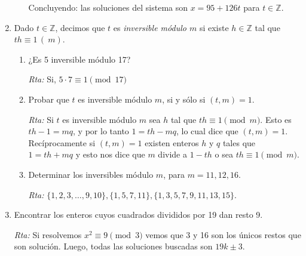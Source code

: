 \documentclass[a4paper,12pt,twoside,spanish,reqno]{amsbook}
\numberwithin{equation}{section}
\newcommand{\rta}{\noindent\textit{Rta: }}
\newcommand \Z{{\mathbb Z}}
\begin{document}
\begin{enumerate}
\begin{enumerate}
        \noindent Concluyendo: las soluciones del sistema son $x = 95 + 126t$ para  $t \in \mathbb{Z}$. 

    \end{enumerate}
    
    
    
    \item Dado $t \in {\Z}$, decimos que $t$ es {\it inversible módulo $m$} si existe $h \in {\Z}$ tal que $th\equiv 1\,(\ m)$.
    \begin{enumerate}
        \item ¿Es 5 inversible módulo 17?
            
        \rta Si, $5\cdot 7\equiv 1 \pmod{17}$
        
        \item Probar que $t$ es inversible módulo $m$, si y sólo si $(t,m)=1$.
            
        \rta Si $t$ es inversible módulo $m$ sea $h$ tal que $th\equiv 1 \pmod{m}$. Esto es $th-1=mq$, y por lo tanto $1=th-mq$, lo cual dice que $(t,m)=1$. Recíprocamente si $(t, m)=1$ existen enteros $h$ y $q$ tales que $1=th+mq$ y esto nos dice que $m$ divide a $1-th$ o sea $th\equiv 1 \pmod{m}$.
        
        \item Determinar los inversibles módulo $m$, para $m=11,12,16$.
            
        \rta $\{1,2,3,\dots, 9,10\}, \{1, 5, 7,11\} , \{1, 3, 5, 7, 9 ,11, 13, 15\}$.
        
    \end{enumerate}
    
    
    
    
    
    \item Encontrar los enteros cuyos cuadrados divididos por 19 dan resto 9.
        
    \rta Si resolvemos $x^2\equiv 9 \pmod{3} $ vemos que 3 y 16 son los únicos restos que son solución. Luego, todas las soluciones buscadas son $19k\pm3$. 
    
    
    

\end{enumerate}
\end{document}

